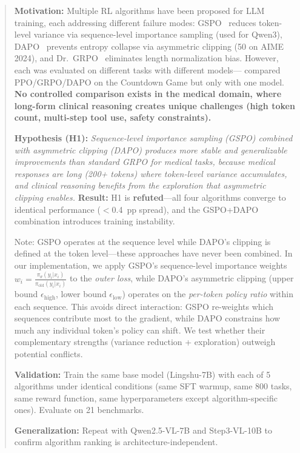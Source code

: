 \documentclass{article}
\begin{document}
\begin{quote}
\textbf{Motivation:} Multiple RL algorithms have been proposed for LLM training, each addressing different failure modes: GSPO~\citep{gspo2025} reduces token-level variance via sequence-level importance sampling (used for Qwen3), DAPO~\citep{dapo2025} prevents entropy collapse via asymmetric clipping (50 on AIME 2024), and Dr.~GRPO~\citep{liu2025drgrpo} eliminates length normalization bias. However, each was evaluated on different tasks with different models---\citet{rl_comparison2025} compared PPO/GRPO/DAPO on the Countdown Game but only with one model. \textbf{No controlled comparison exists in the medical domain, where long-form clinical reasoning creates unique challenges (high token count, multi-step tool use, safety constraints).}

\textbf{Hypothesis (H1):} \textit{Sequence-level importance sampling (GSPO) combined with asymmetric clipping (DAPO) produces more stable and generalizable improvements than standard GRPO for medical tasks, because medical responses are long (200+ tokens) where token-level variance accumulates, and clinical reasoning benefits from the exploration that asymmetric clipping enables.} \textbf{Result:} H1 is \textbf{refuted}---all four algorithms converge to identical performance ($<$0.4~pp spread), and the GSPO+DAPO combination introduces training instability.

Note: GSPO operates at the sequence level while DAPO's clipping is defined at the token level---these approaches have never been combined. In our implementation, we apply GSPO's sequence-level importance weights $w_i = \frac{\pi_\theta(y_i|x_i)}{\pi_{\text{old}}(y_i|x_i)}$ to the \emph{outer loss}, while DAPO's asymmetric clipping (upper bound $\epsilon_{\text{high}}$, lower bound $\epsilon_{\text{low}}$) operates on the \emph{per-token policy ratio} within each sequence. This avoids direct interaction: GSPO re-weights which sequences contribute most to the gradient, while DAPO constrains how much any individual token's policy can shift. We test whether their complementary strengths (variance reduction + exploration) outweigh potential conflicts.

\textbf{Validation:} Train the same base model (Lingshu-7B) with each of 5 algorithms under identical conditions (same SFT warmup, same 800 tasks, same reward function, same hyperparameters except algorithm-specific ones). Evaluate on 21 benchmarks.

\textbf{Generalization:} Repeat with Qwen2.5-VL-7B and Step3-VL-10B to confirm algorithm ranking is architecture-independent.
\end{quote}
\end{document}

